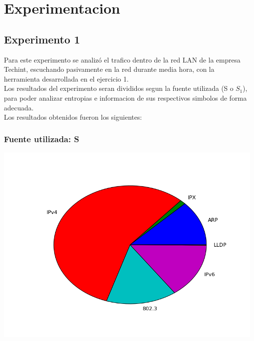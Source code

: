 \documentclass[final,narroweqnarray,inline]{ieee}
\begin{document}
\section{Experimentacion}


\subsection{Experimento 1}
Para este experimento se analiz\'o el trafico dentro de la red LAN de la empresa Techint, escuchando pasivamente
en la red durante media hora, con la herramienta desarrollada en el ejercicio 1. \\
Los resultados del experimento seran divididos segun la fuente utilizada (S o $S_{1}$), para poder analizar
entropias e informacion de sus respectivos simbolos de forma adecuada. \\
Los resultados obtenidos fueron los siguientes: 

\subsubsection{Fuente utilizada: S}

\includegraphics[scale=0.5]{graficos/techint_pie.png} \\
\end{document}
